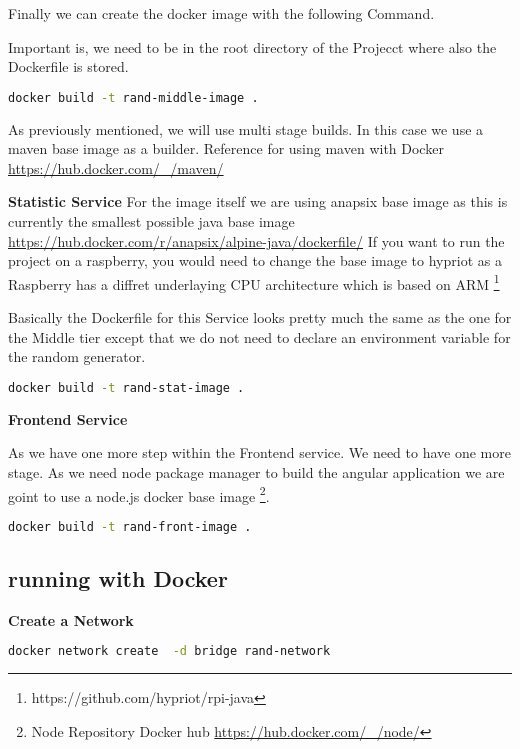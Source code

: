 Finally we can create the docker image with the following Command.

Important is, we need to be in the root directory of the Projecct where also the Dockerfile is stored.
\begin{lstlisting}[language=Bash]
docker build -t rand-middle-image .
\end{lstlisting}
As previously mentioned, we will use multi stage builds. In this case we use a maven base image as a builder.
Reference for using maven with Docker \url{https://hub.docker.com/_/maven/}

\textbf{Statistic Service}
For the image itself we are using anapsix base image as this is currently the smallest possible java base image \url{https://hub.docker.com/r/anapsix/alpine-java/dockerfile/}
If you want to run the project on a raspberry, you would need to change the base image to hypriot as a Raspberry has a diffret underlaying CPU architecture which is based on ARM \footnote{https://github.com/hypriot/rpi-java}





Basically the Dockerfile for this Service looks pretty much the same as the one for the Middle tier except that we do not need to declare an environment variable for the random generator.

\begin{lstlisting}[language=Bash]
docker build -t rand-stat-image .
\end{lstlisting}

\textbf{Frontend Service}

As we have one more step within the Frontend service. We need to have one more stage. As we need node package manager to build the angular application we are goint to use a node.js docker base image \footnote{ Node Repository Docker hub \url{https://hub.docker.com/_/node/}}.




\begin{lstlisting}[language=Bash]
docker build -t rand-front-image .
\end{lstlisting}


\subsection{running with Docker}

\textbf{Create a Network}
\begin{lstlisting}[language=Bash]
docker network create  -d bridge rand-network
\end{lstlisting}

